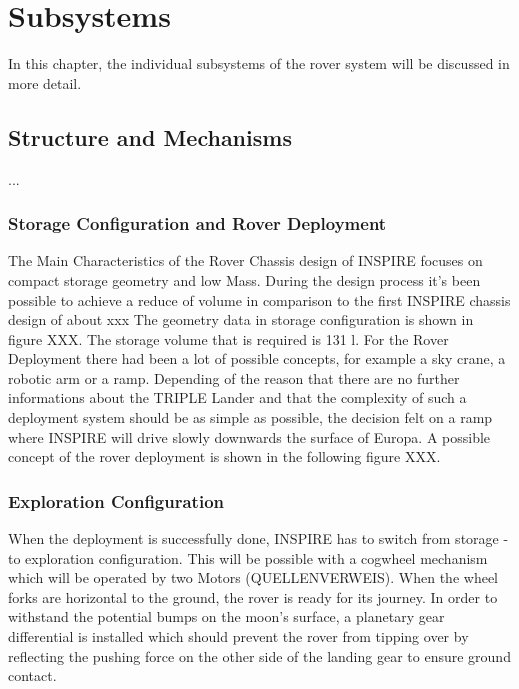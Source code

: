 \chapter{Subsystems}
\label{chap:subsystems}

In this chapter, the individual subsystems of the rover system will be discussed in more detail.

\section{Structure and Mechanisms}
\label{sec:mechanics}

...

\subsection{Storage Configuration and Rover Deployment}

The Main Characteristics of the Rover Chassis design of INSPIRE focuses on compact storage geometry and low Mass. 
During the design process it's been possible to achieve a reduce of volume in comparison to the first INSPIRE chassis design of about xxx%
The geometry data in storage configuration is shown in figure XXX.
The storage volume that is required is 131 l.
For the Rover Deployment there had been a lot of possible concepts, for example a sky crane, a robotic arm or a ramp. Depending of the reason that there are no further informations about the TRIPLE Lander and that the complexity of such a deployment system should be as simple as possible, the decision felt on a ramp where INSPIRE will drive slowly downwards the surface of Europa. 
A possible concept of the rover deployment is shown in the following figure XXX.

\subsection{Exploration Configuration}

When the deployment is successfully done, INSPIRE has to switch from storage - to exploration configuration.
This will be possible with a cogwheel mechanism which will be operated by two Motors (QUELLENVERWEIS). When the wheel forks are horizontal to the ground, the rover is ready for its journey. In order to withstand the potential bumps on the moon's surface, a planetary gear differential is installed which should prevent the rover from tipping over by reflecting the pushing force on the other side of the landing gear to ensure ground contact. 


